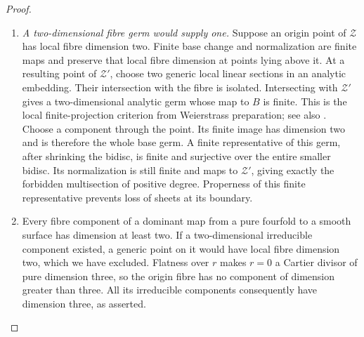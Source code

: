 \begin{proof}
\begin{enumerate}[label=\arabic*.,leftmargin=*]
\item \emph{A two-dimensional fibre germ would supply one.}
Suppose an origin point of $\mathcal Z$ has local
fibre dimension two. Finite base change and
normalization are finite maps and preserve that
local fibre dimension at points lying above it.
At a resulting point of $\mathcal Z'$, choose
two generic local linear sections in an analytic
embedding. Their intersection with the fibre is
isolated. Intersecting with $\mathcal Z'$ gives
a two-dimensional analytic germ whose map to
$B$ is finite. This is the local finite-projection
criterion from Weierstrass preparation; see also
\citet[Chapter~II, Proposition~8.2 and its proof, pp.~116--117]{Demailly2012E}.
Choose a component through the point. Its finite
image has dimension two and is therefore the
whole base germ. A finite representative of this
germ, after shrinking the bidisc, is finite and
surjective over the entire smaller bidisc. Its
normalization is still finite and maps to
$\mathcal Z'$, giving exactly the forbidden
multisection of positive degree. Properness of
this finite representative prevents loss of
sheets at its boundary.

\item Every fibre component of a dominant map from a
pure fourfold to a smooth surface has dimension
at least two. If a two-dimensional irreducible
component existed, a generic point on it would
have local fibre dimension two, which we have
excluded. Flatness over $r$ makes $r=0$ a
Cartier divisor of pure dimension three, so
the origin fibre has no component of dimension
greater than three. All its irreducible
components consequently have dimension three,
as asserted.
\end{enumerate}
\end{proof}